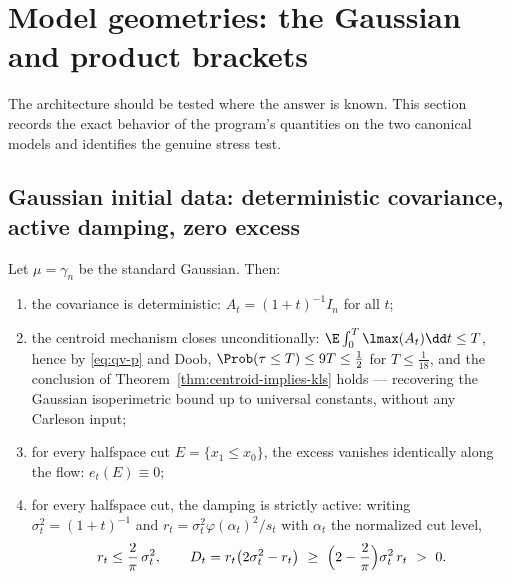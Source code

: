 \documentclass[../../main.tex]{subfiles}
\begin{document}
\section{Model geometries: the Gaussian and product brackets}
\label{sec:models}

The architecture should be tested where the answer is known. This section records the exact
behavior of the program's quantities on the two canonical models and identifies the genuine
stress test.

\subsection{Gaussian initial data: deterministic covariance, active damping, zero excess}

\begin{proposition}
\label{prop:gaussian-model}
Let $\mu=\gamma_n$ be the standard Gaussian. Then:
\begin{enumerate}[label=(\roman*),leftmargin=2.2em]
\item the covariance is deterministic: $A_t=(1+t)^{-1}I_n$ for all $t$;
\item the centroid mechanism closes unconditionally: $\E\int_0^T\lmax(A_t)\dd t\le T$, hence by
\eqref{eq:qv-p} and Doob, $\Prob(\tau\le T)\le9T\le\tfrac12$ for $T\le\tfrac1{18}$, and the
conclusion of Theorem~\ref{thm:centroid-implies-kls} holds --- recovering the Gaussian
isoperimetric bound up to universal constants, without any Carleson input;
\item for every halfspace cut $E=\{x_1\le x_0\}$, the excess vanishes identically along the
flow: $e_t(E)\equiv0$;
\item for every halfspace cut, the damping is strictly active: writing
$\sigma_t^2=(1+t)^{-1}$ and $r_t=\sigma_t^2\varphi(\alpha_t)^2/s_t$ with
$\alpha_t$ the normalized cut level,
\[
  r_t\le\frac2\pi\,\sigma_t^2,
  \qquad
  D_t=r_t\bigl(2\sigma_t^2-r_t\bigr)\ \ge\ \Bigl(2-\frac2\pi\Bigr)\sigma_t^2\,r_t\ >\ 0 .
\]
\end{enumerate}
\end{proposition}
\end{document}
